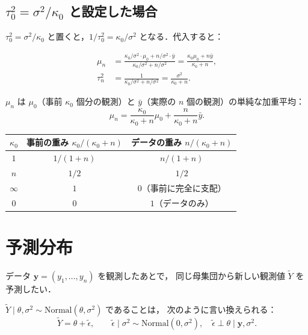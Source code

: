 \documentclass[lualatex,ja=standard,a4paper,12pt]{bxjsarticle}
\begin{document}
\subsection{$\tau_0^2 = \sigma^2/\kappa_0$ と設定した場合}

$\tau_0^2 = \sigma^2/\kappa_0$ と置くと，$1/\tau_0^2 = \kappa_0/\sigma^2$ となる．代入すると：

\begin{align*}
  \mu_n
  &= \frac{\kappa_0/\sigma^2 \cdot \mu_0 + n/\sigma^2 \cdot \bar{y}}
         {\kappa_0/\sigma^2 + n/\sigma^2}
   = \frac{\kappa_0 \mu_0 + n\bar{y}}{\kappa_0 + n}, \\[6pt]
  \tau_n^2
  &= \frac{1}{\kappa_0/\sigma^2 + n/\sigma^2}
   = \frac{\sigma^2}{\kappa_0 + n}.
\end{align*}

$\mu_n$ は $\mu_0$（事前 $\kappa_0$ 個分の観測）と $\bar{y}$（実際の $n$ 個の観測）の単純な加重平均：
\[
  \mu_n = \frac{\kappa_0}{\kappa_0 + n}\mu_0 + \frac{n}{\kappa_0 + n}\bar{y}.
\]

\begin{center}
\begin{tabular}{ccc}
\toprule
$\kappa_0$ & 事前の重み $\kappa_0/(\kappa_0+n)$ & データの重み $n/(\kappa_0+n)$ \\
\midrule
$1$ & $1/(1+n)$ & $n/(1+n)$ \\
$n$ & $1/2$ & $1/2$ \\
$\infty$ & $1$ & $0$（事前に完全に支配） \\
$0$ & $0$ & $1$（データのみ） \\
\bottomrule
\end{tabular}
\end{center}


\section{予測分布}

データ $\mathbf{y} = (y_1, \ldots, y_n)$ を観測したあとで，
同じ母集団から新しい観測値 $\tilde{Y}$ を予測したい．

$\tilde{Y} \mid \theta, \sigma^2 \sim \mathrm{Normal}(\theta, \sigma^2)$ であることは，
次のように言い換えられる：
\[
  \tilde{Y} = \theta + \tilde{\epsilon}, \qquad
  \tilde{\epsilon} \mid \sigma^2 \sim \mathrm{Normal}(0, \sigma^2),
  \quad \tilde{\epsilon} \perp \theta \mid \mathbf{y}, \sigma^2.
\]
\end{document}
